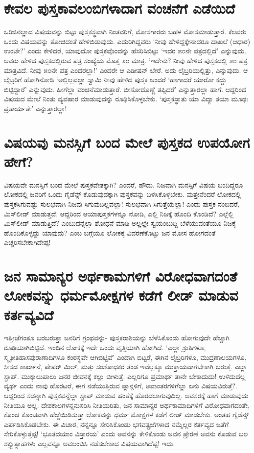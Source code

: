 \section*{ಕೇವಲ ಪುಸ್ತಕಾವಲಂಬಿಗಳಾದಾಗ ವಂಚನೆಗೆ ಎಡೆಯಿದೆ}

ಒರಿಜಿನಲ್ಲಾದ ವಿಷಯವನ್ನು ಬಿಟ್ಟು ಪುಸ್ತಕಸ್ಥವಾಗಿ ನಿಂತವರಿಗೆ, ಮೋಸಗಾರರು ಬಹಳ ಮೋಸಮಾಡುತ್ತಾರೆ. ಕೆಲವರು ಒಂದು ವಿಷಯವನ್ನು ತೋಚಿದಂತೆ ಹೇಳಿಬಿಡುವುದು. ಎದುರಿಗಿದ್ದವರು `ನೀವು ಹೇಳಿದ್ದಕ್ಕೇನಾದರೂ ದಾಖಲೆ (ಆಧಾರ) ಉಂಟೇ?' ಎಂದು ಕೇಳಿದರೆ, ಯಾವುದೋ ಪುಸ್ತಕವೊಂದನ್ನು ಹೆಸರಿಸಿಬಿಟ್ಟು `ಇದರ ೫೦ನೇ ಪತ್ರದಲ್ಲಿದೆ' ಎನ್ನುವುದು. ಅವರು ಹೇಳಿದ ಪುಸ್ತಕದಲ್ಲಿರುವ ಪತ್ರ ಸಂಖ್ಯೆಯ ಮೊತ್ತ ೨೦ ಮಾತ್ರ. `ಇದೇನು? ನೀವು ಹೇಳಿದ ಪುಸ್ತಕದಲ್ಲಿ ೨೦ ಪತ್ರ ಮಾತ್ರವಿದೆ. ನೀವು ೫೦ನೇ ಪತ್ರ ಎಂದರಲ್ಲಾ!' ಎಂದರೇ ಆ ಎಡೀಷನ್ ಬೇರೆ. ಅದು ಲೈಬ್ರರಿಯಲ್ಲಿತ್ತು, ಎನ್ನುವುದು. ಆ ಲೈಬ್ರರಿಗೆ ಹೋಗಿನೋಡಿ `ಅಲ್ಲಿಲ್ಲವಲ್ಲಾ ಸ್ವಾಮಿ ನೀವು ಹೇಳಿದ ಪುಸ್ತಕ ಅಂದರೆ `ಹಾಗಾದರೆ ಯಾರೋ ಕದ್ದು ಬಿಟ್ಟಿದ್ದಾರೆ' ಎನ್ನುವುದು. ಹೀಗೆಲ್ಲಾ ವಂಚನೆಮಾಡುತ್ತಾರೆ. ಬೀಸೋದೊಣ್ಣೆ ತಪ್ಪಿದರೆ' ಎನ್ನುತ್ತಾರಲ್ಲಾ ಹಾಗೆ. ಆದ್ದರಿಂದ ವಿಷಯದ ಮೇಲೆ ನಿಂತು ವ್ಯವಹಾರ ಮಾಡುವುದನ್ನು ರೂಢಿಸಿಕೊಳ್ಳಬೇಕು. `ಪುಸ್ತಕಸ್ಥಾತು ಯಾ ವಿದ್ಯಾ\label{114} ತಯಾ ಮೂಢಃ ಪ್ರತಾರ್ಯತೇ' ಎನ್ನುತ್ತಾರಲ್ಲಾ!

\section*{ವಿಷಯವು ಮನಸ್ಸಿಗೆ ಬಂದ ಮೇಲೆ ಪುಸ್ತಕದ ಉಪಯೋಗ ಹೇಗೆ?}

ವಿಷಯವೇ ಮನಸ್ಸಿಗೆ ಬಂದ ಮೇಲೆ ಪುಸ್ತಕವೇತಕ್ಕಾಗಿ? ಎಂದರೆ, ಹೌದು. ನಿಜವಾಗಿ ಮನಸ್ಸಿಗೆ ವಿಷಯ ಬಂದಿದ್ದರೂ ಲೋಕದಲ್ಲಿ ಜನರಿಗೆ ಒಂದು ಗೈಡೆನ್ಸ್  ಕೊಡುವುದಕ್ಕಾಗಿ ಪುಸ್ತಕವನ್ನು ಬಳಸಿಕೊಳ್ಳಬೇಕು. ಮತ್ತೇನೆಂದರೆ ಲೋಕದಲ್ಲಿ ಪುಸ್ತಕಸಿಗುವಷ್ಟು ಸುಲಭವಾಗಿ ನಿಜವು ಸಿಗುವುದಿಲ್ಲವಲ್ಲಾ! ಸುಲಭವಾಗಿ ಸಿಗುತ್ತೆಯೆಲ್ಲಾ! ಎಂದು ಪುಸ್ತಕ ನಂಬಿದರೆ, ಮಿಸ್‌ಲೀಡ್ ಮಾಡುತ್ತದೆ. ಆದ್ದರಿಂದ ಆಯಾಪುಸ್ತಕಗಳನ್ನೂ ನೋಡಿ, ಎಲ್ಲಿ ನಿಜಕ್ಕೆ ಹೊಂದಿ ಕೊಂಡಿದೆ? ಎಲ್ಲೆಲ್ಲಿ ಮಿಸ್‌ಲೀಡ್ ಮಾಡುತ್ತಿದೆ? ಎಂಬುದನ್ನೆಲ್ಲಾ ಶೋಧನೆ ಮಾಡಿ ಅಲ್ಲಲ್ಲೇ ಸ್ವಯಂಬುದ್ದಿ ಬೆಳೆಯುವಂತೆಯೂ ನಿಜಕ್ಕೆ ಹೊಂದಿಕೊಳ್ಳದ್ದು ಯಾವುದು? ಎಂಬ ಬಗ್ಗೆಯೂ ಲೋಕಕ್ಕೆ ವಿವರಣೆಕೊಟ್ಟು ಜನ ಮೋಸ ಹೋಗದಂತೆ ಎಚ್ಚರಿಸಬೇಕಾಗಿದೇಪ್ಪ!

\section*{ಜನ ಸಾಮಾನ್ಯರ ಅರ್ಥಕಾಮಗಳಿಗೆ ವಿರೋಧವಾಗದಂತೆ ಲೋಕವನ್ನು ಧರ್ಮಮೋಕ್ಷಗಳ ಕಡೆಗೆ ಲೀಡ್ ಮಾಡುವ ಕರ್ತವ್ಯವಿದೆ}

ಇತ್ತೀಚೆಗಂತೂ ಬರಬರುತ್ತಾ ಜನರಿಗೆ ಗ್ರಂಥವನ್ನು- ಪುಸ್ತಕರಾಶಿಯನ್ನು ಬೆಳೆಸಿಕೊಂಡು ಹೋಗುವುದೇ ಹೆಚ್ಚಾಗಿ ರೂಢಿಯಾಗಿಬಿಟ್ಟಿದೆ. ಇಂದಿನ ಲೋಕಕ್ಕೆ ಇದೇ ಒಂದು  ವೃತ್ತಿಯಾಗಿ ಹೋಗಿದೆ. `ಎಲ್ಲಾ ಶ್ರುತಿಗಳೂ, ಸ್ಮೃತೀತಿಹಾಸಪುರಾಣಾದಿಗಳೂ ಕಂಠಸ್ಥವೇ ಆಗಿಬಿಟ್ಟಿವೆ' ಎಂದಾಗಿ ಬಿಟ್ಟರೆ, ಈಗಿನ ಲೈಬ್ರರಿಗಳೂ, ಮುದ್ರಣಾಲಯಗಳೂ, ಸೀಸದ ಕಾರ್ಖಾನೆ, ಪೇಪರ್ ಮಿಲ್, ಮತ್ತು ಸಂಶೋಧಕರ ತಂಡ ಇವೆಲ್ಲಕ್ಕೂ ಮುಕ್ತಾಯವಾಗಬೇಕಾಗಿ ಬರುತ್ತೆ. ಎಲ್ಲಾ ಸ್ಟಾಪ್. ಮುಕ್ಕಾಲುಪಾಲು ಜನರ ಜೀವನಕ್ಕೆ ಕಲ್ಲು ಬೀಳುತ್ತೆ. ಎಲ್ಲರಿಗೂ ಪ್ರಮಾರ್ಥ ತಾನೇ ಬೇಕಾದುದು! ಉಳಿದುದೆಲ್ಲ ವ್ಯರ್ಥ ಎಂದು ನಾವು ಹೊರಟರೆ, ಈಗ ನಡೆಯುತ್ತಿರುವ ಪ್ಲಾನ್ಗಳಿಗೆ, ಅವಾಂತರಗಳಿಗೆಲ್ಲಾ ಏನು ವಿಷಯವಿರುತ್ತೆ?. ಆದ್ದರಿಂದ ಸಡನ್ನಾಗಿ ಪುಸ್ತಕವನ್ನೆಲ್ಲಾ ಸ್ಟಾಪ್ ಮಾಡುವ ಹಂತೆಕ್ಕೆ ಹೊರಡಲಾಗುವುದಿಲ್ಲ. ಅವಸರಕ್ಕೆ ಹಾಗೆ ಮಾಡುವುದು ನೀತಿಯೂ ಅಲ್ಲ. ದೇಶಕಾಲಗಳನ್ನನುಸರಿಸಿ ನೀತಿಯರಿತು, ಜನ ಸಾಮಾನ್ಯರ ಅರ್ಥಕಾಮಾದಿಗಳಿಗೆ ವಿರೋಧವಾಗದಂತೇ, ಕೊಂಚ ಕೊಂಚವಾಗಿ ಹೆಜ್ಜೆಯಿಡಿಸುತ್ತಾ ಲೋಕವನ್ನು ಧರ್ಮ ಮೋಕ್ಷಗಳ ಕಡೆಗೆ ಲೀಡ್ ಮಾಡಬೇಕು. ಅಂತಹ ಗೈಡೆನ್ಸ್  ಎರ್ಪಡಿಸಿಕೊಡಬೇಕು. ಈ ವಿಚಾರ, ನನ್ನನ್ನೂ ಸೇರಿಸಿಕೊಂಡು ಭಗವತ್ಪ್ರಜೆಗಳಾದ ನಮ್ಮೆಲ್ಲರ ಕರ್ತವ್ಯದ ಜತೆಗೆ ಸೇರಿಕೊಳ್ಳುತ್ತೆಪ್ಪ! `ಭೂತದಯಾಂ ವಿಸ್ತಾರಯ'\label{115b} ಎಂದು ಅವನನ್ನು ಕೇಳಿಕೊಂಡು ಅವನ ಪ್ರೇರಣೆ ಅವನು ಕೊಡುವ ಬಲ ಶಕ್ತ್ಯುತ್ಸಾಹಗಳು ಎಲ್ಲವನ್ನೂ ಅವಲಂಬಿಸಿ ನಡೆಸಬೇಕಾದ ವಿಷಯವಾಗಿದೆಪ್ಪ! ಇದು.

